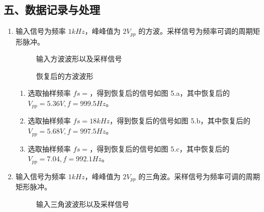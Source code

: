 \documentclass[dvipsnames, svgnames,a4paper,11pt]{article}
\begin{document}
\subsection*{五、数据记录与处理}
  \begin{enumerate}
    \item 输入信号为频率 $1kHz$，峰峰值为 $2V_{pp}$ 的方波。采样信号为频率可调的周期矩形脉冲。
      \begin{figure}[htbp]
        \centering
        \caption{输入方波波形以及采样信号}
      \end{figure}
      \begin{figure}[htbp]
        \centering

        \caption{恢复后的方波波形}
      \end{figure}
      
      \begin{enumerate}
        \item 选取抽样频率 $fs = $，得到恢复后的信号如图 5.a，其中恢复后的 $V_{pp} = 5.36V,f = 999.5Hz$。
        \item 选取抽样频率 $fs = 18kHz$，得到恢复后的信号如图 5.b，其中恢复后的 $V_{pp} = 5.68V,f = 997.5Hz$。
        \item 选取抽样频率 $fs = $，得到恢复后的信号如图 5.c，其中恢复后的 $V_{pp} = 7.04,f = 992.1Hz$。
      \end{enumerate}


    \newpage
    \item 输入信号为频率 $1kHz$，峰峰值为 $2V_{pp}$ 的三角波。采样信号为频率可调的周期矩形脉冲。
      \begin{figure}[htbp]
        \centering
        \caption{输入三角波波形以及采样信号}
      \end{figure}
      \begin{figure}[htbp]
        \centering


\end{figure}
\end{enumerate}
\end{document}
